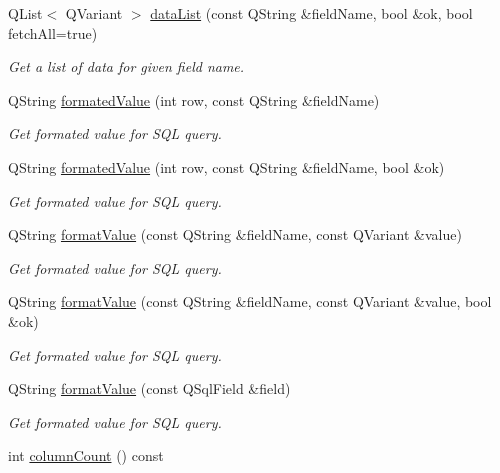 \begin{DoxyCompactItemize}
Q\-List$<$ Q\-Variant $>$ \hyperlink{classmdt_abstract_sql_table_controller_a712e896a677fc0f6660305c35947ef9f}{data\-List} (const Q\-String \&field\-Name, bool \&ok, bool fetch\-All=true)
\begin{DoxyCompactList}\small\item\em Get a list of data for given field name. \end{DoxyCompactList}\item 
Q\-String \hyperlink{classmdt_abstract_sql_table_controller_ae904bcb5f6656e6f88a3c3c73191e337}{formated\-Value} (int row, const Q\-String \&field\-Name)
\begin{DoxyCompactList}\small\item\em Get formated value for S\-Q\-L query. \end{DoxyCompactList}\item 
Q\-String \hyperlink{classmdt_abstract_sql_table_controller_a359d809042ec35007a58dacb6a1172ea}{formated\-Value} (int row, const Q\-String \&field\-Name, bool \&ok)
\begin{DoxyCompactList}\small\item\em Get formated value for S\-Q\-L query. \end{DoxyCompactList}\item 
Q\-String \hyperlink{classmdt_abstract_sql_table_controller_a17b43facd84cd020c498ac3367b49595}{format\-Value} (const Q\-String \&field\-Name, const Q\-Variant \&value)
\begin{DoxyCompactList}\small\item\em Get formated value for S\-Q\-L query. \end{DoxyCompactList}\item 
Q\-String \hyperlink{classmdt_abstract_sql_table_controller_a1cd1d86cde47b62ca4a272f4334adf9d}{format\-Value} (const Q\-String \&field\-Name, const Q\-Variant \&value, bool \&ok)
\begin{DoxyCompactList}\small\item\em Get formated value for S\-Q\-L query. \end{DoxyCompactList}\item 
Q\-String \hyperlink{classmdt_abstract_sql_table_controller_ae42bd2919d96b66e9dcd73f041b6ad58}{format\-Value} (const Q\-Sql\-Field \&field)
\begin{DoxyCompactList}\small\item\em Get formated value for S\-Q\-L query. \end{DoxyCompactList}\item 
int \hyperlink{classmdt_abstract_sql_table_controller_a0dd5f5dc2934dc16ee80cbe03fc0473b}{column\-Count} () const 

\end{DoxyCompactItemize}
